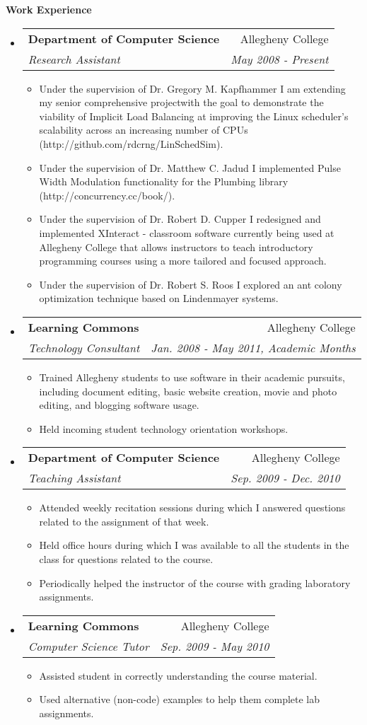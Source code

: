 \documentclass[letterpaper,11pt]{article}
\makeatletter
\newcommand{\resitem}[1]{\item #1 \vspace{-2pt}}
\newcommand{\resheading}[1]{{\large \colorbox{mygrey}{\begin{minipage}{\textwidth}{\textbf{#1 \vphantom{p\^{E}}}}\end{minipage}}}}
\newcommand{\ressubheading}[4]{
\begin{tabular*}{7.0in}{l@{\extracolsep{\fill}}r}
		\textbf{#1} & #2 \\
		\textit{#3} & \textit{#4} \\
\end{tabular*}\vspace{-6pt}}
\makeatother
\begin{document}
\resheading{Work Experience}
\begin{itemize}
\item
	\ressubheading{Department of Computer Science}{Allegheny College}{Research Assistant}{May 2008 - Present}
	\begin{itemize}
	    \resitem{Under the supervision of Dr. Gregory M. Kapfhammer I am extending my senior comprehensive projectwith the goal to demonstrate the viability of Implicit Load Balancing at improving the Linux scheduler's scalability across an increasing number of CPUs (http://github.com/rdcrng/LinSchedSim).}
		\resitem{Under the supervision of Dr. Matthew C. Jadud I implemented Pulse Width Modulation functionality for the Plumbing library (http://concurrency.cc/book/).}
		\resitem{Under the supervision of Dr. Robert D. Cupper I redesigned and implemented XInteract - classroom software currently being used at Allegheny College that allows instructors to teach introductory programming courses using a more tailored and focused approach.}
		\resitem{Under the supervision of Dr. Robert S. Roos I explored an ant colony optimization technique based on Lindenmayer systems.}
	\end{itemize}
	
\item
	\ressubheading{Learning Commons}{Allegheny College}{Technology Consultant}{Jan. 2008 - May 2011, Academic Months}
	\begin{itemize}
		\resitem{Trained Allegheny students to use software in their academic pursuits, including document editing, basic website creation, movie and photo editing, and blogging software usage.}
		\resitem{Held incoming student technology orientation workshops.}
	\end{itemize}

\item
	\ressubheading{Department of Computer Science}{Allegheny College}{Teaching Assistant}{Sep. 2009 - Dec. 2010}
	\begin{itemize}
		\resitem{Attended weekly recitation sessions during which I answered questions related to the assignment of that week.}
		\resitem{Held office hours during which I was available to all the students in the class for questions related to the course.}
		\resitem{Periodically helped the instructor of the course with grading laboratory assignments.}
	\end{itemize}

\item
	\ressubheading{Learning Commons}{Allegheny College}{Computer Science Tutor}{Sep. 2009 - May 2010}
	\begin{itemize}
		\resitem{Assisted student in correctly understanding the course material.}
		\resitem{Used alternative (non-code) examples to help them complete lab assignments.}
	\end{itemize}
	
\end{itemize}
\end{document}

